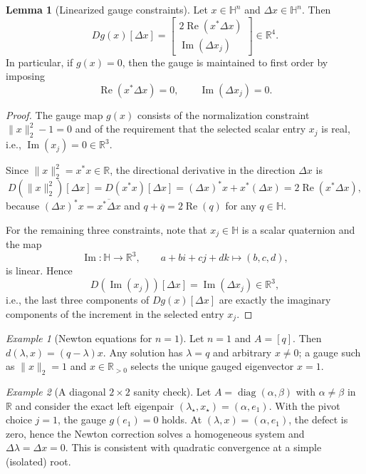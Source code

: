 \documentclass[preprint,12pt]{elsarticle}  %
\theoremstyle{definition}
\theoremstyle{definition}
\theoremstyle{definition}
\newtheorem{Lem}{Lemma}
\theoremstyle{definition}
\theoremstyle{definition}
\theoremstyle{remark}
\theoremstyle{remark}
\newtheorem{Ex}{Example}
\theoremstyle{remark}
\DeclareRobustCommand{\i}{\ensuremath{\mathbf{i}}}
\DeclareRobustCommand{\j}{\ensuremath{\mathbf{j}}}
\DeclareRobustCommand{\k}{\ensuremath{\mathbf{k}}}
\def\i{i}\def\j{j}\def\k{k}%
\renewcommand{\Re}{\operatorname{Re}}
\renewcommand{\Im}{\operatorname{Im}}
\newcommand{\RR}{\mathbb{R}}
\newcommand{\HH}{\mathbb{H}}
\DeclareMathOperator{\diag}{diag}
\begin{document}
\begin{Lem}[Linearized gauge constraints]
\label{lem_linearized_gauge}
Let $x\in\HH^n$ and $\Delta x\in\HH^n$. Then
\[
Dg(x)[\Delta x]=
\begin{bmatrix}
2\Re(x^\ast \Delta x)\\[0.3mm]
\Im(\Delta x_j)
\end{bmatrix}\in\RR^4.
\]
In particular, if $g(x)=0$, then the gauge is maintained to first order by imposing
\begin{equation}
\label{eq_newton_gauge_lin}
\Re(x^\ast \Delta x)=0,\qquad \Im(\Delta x_j)=0.
\end{equation}
\end{Lem}

\begin{proof}
The gauge map $g(x)$ consists of the normalization constraint $\|x\|_2^2-1=0$ and of the requirement that the selected
scalar entry $x_j$ is real, i.e., $\Im(x_j)=0\in\RR^3$.

Since $\|x\|_2^2=x^\ast x\in\RR$, the directional derivative in the direction $\Delta x$ is
\[
D(\|x\|_2^2)[\Delta x]
= D(x^\ast x)[\Delta x]
= (\Delta x)^\ast x + x^\ast(\Delta x)
= 2\Re(x^\ast\Delta x),
\]
because $(\Delta x)^\ast x=\overline{x^\ast\Delta x}$ and $q+\overline{q}=2\Re(q)$ for any $q\in\HH$.

For the remaining three constraints, note that $x_j\in\HH$ is a scalar quaternion and the map
\[
\Im:\HH\to\RR^3,\qquad a+b\i+c\j+d\k \mapsto (b,c,d),
\]
is linear. Hence
\[
D(\Im(x_j))[\Delta x]=\Im(\Delta x_j)\in\RR^3,
\]
i.e., the last three components of $Dg(x)[\Delta x]$ are exactly the imaginary components of the increment in the selected entry $x_j$.
\end{proof}


\begin{Ex}[Newton equations for $n=1$]
\label{ex_newton_n1}
Let $n=1$ and $A=[q]$. Then $d(\lambda,x)=(q-\lambda)x$.
Any solution has $\lambda=q$ and arbitrary $x\neq 0$; a gauge such as $\|x\|_2=1$ and $x\in\RR_{>0}$ selects the
unique gauged eigenvector $x=1$.
\end{Ex}

\begin{Ex}[A diagonal $2\times2$ sanity check]
\label{ex_newton_diag_2x2}
Let $A=\diag(\alpha,\beta)$ with $\alpha\neq\beta$ in $\RR$ and consider the exact left eigenpair
$(\lambda_\star,x_\star)=(\alpha,e_1)$. With the pivot choice $j=1$, the gauge $g(e_1)=0$ holds.
At $(\lambda,x)=(\alpha,e_1)$, the defect is zero, hence the Newton correction solves a homogeneous system and
$\Delta\lambda=\Delta x=0$.
This is consistent with quadratic convergence at a simple (isolated) root.
\end{Ex}
\end{document}
